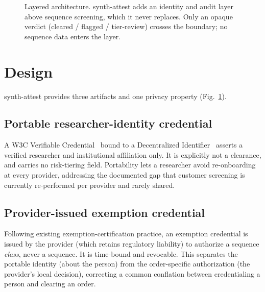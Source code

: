 \documentclass[conference]{IEEEtran}
\begin{document}
\begin{figure}[t]
\centering
{}
\caption{Layered architecture. synth-attest adds an identity and audit layer above sequence
screening, which it never replaces. Only an opaque verdict (cleared / flagged / tier-review)
crosses the boundary; no sequence data enters the layer.}
\label{fig:arch}
\end{figure}

\section{Design}
synth-attest provides three artifacts and one privacy property (Fig.~\ref{fig:arch}).

\subsection{Portable researcher-identity credential}
A W3C Verifiable Credential~\cite{w3cvc} bound to a Decentralized Identifier~\cite{w3cdid}
asserts a verified researcher and institutional affiliation only. It is explicitly not a
clearance, and carries no risk-tiering field. Portability lets a researcher avoid re-onboarding
at every provider, addressing the documented gap that customer screening is currently
re-performed per provider and rarely shared.

\subsection{Provider-issued exemption credential}
Following existing exemption-certification practice, an exemption credential is issued by the
provider (which retains regulatory liability) to authorize a sequence \textit{class}, never a
sequence. It is time-bound and revocable. This separates the portable identity (about the
person) from the order-specific authorization (the provider's local decision), correcting a
common conflation between credentialing a person and clearing an order.
\end{document}
